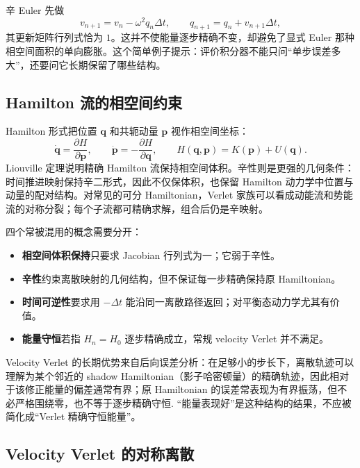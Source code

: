 \documentclass[UTF8,10pt,a4paper,fontset=none]{ctexart}
\begin{document}
辛 Euler 先做
\begin{equation}
  v_{n+1}=v_n-\omega^2q_n\Delta t,
  \qquad q_{n+1}=q_n+v_{n+1}\Delta t,
\end{equation}
其更新矩阵行列式恰为 $1$。这并不使能量逐步精确不变，却避免了显式 Euler 那种相空间面积的单向膨胀。这个简单例子提示：评价积分器不能只问“单步误差多大”，还要问它长期保留了哪些结构。

\subsection{Hamilton 流的相空间约束}

Hamilton 形式把位置 $\bm q$ 和共轭动量 $\bm p$ 视作相空间坐标：
\begin{equation}
  \dot{\bm q}=\frac{\partial H}{\partial \bm p},
  \qquad
  \dot{\bm p}=-\frac{\partial H}{\partial \bm q},
  \qquad
  H(\bm q,\bm p)=K(\bm p)+U(\bm q).
\end{equation}
Liouville 定理说明精确 Hamilton 流保持相空间体积。辛性则是更强的几何条件：时间推进映射保持辛二形式，因此不仅保体积，也保留 Hamilton 动力学中位置与动量的配对结构。对常见的可分 Hamiltonian，Verlet 家族可以看成动能流和势能流的对称分裂；每个子流都可精确求解，组合后仍是辛映射\cite{hairer2006}。

四个常被混用的概念需要分开：
\begin{itemize}
  \item \textbf{相空间体积保持}只要求 Jacobian 行列式为一；它弱于辛性。
  \item \textbf{辛性}约束离散映射的几何结构，但不保证每一步精确保持原 Hamiltonian。
  \item \textbf{时间可逆性}要求用 $-\Delta t$ 能沿同一离散路径返回；对平衡态动力学尤其有价值。
  \item \textbf{能量守恒}若指 $H_n=H_0$ 逐步精确成立，常规 velocity Verlet 并不满足。
\end{itemize}
Velocity Verlet 的长期优势来自后向误差分析：在足够小的步长下，离散轨迹可以理解为某个邻近的 shadow Hamiltonian（影子哈密顿量）的精确轨迹，因此相对于该修正能量的偏差通常有界；原 Hamiltonian 的误差常表现为有界振荡，但不必严格围绕零，也不等于逐步精确守恒\cite{hairer2006}. “能量表现好”是这种结构的结果，不应被简化成“Verlet 精确守恒能量”。

\subsection{Velocity Verlet 的对称离散}
\end{document}
